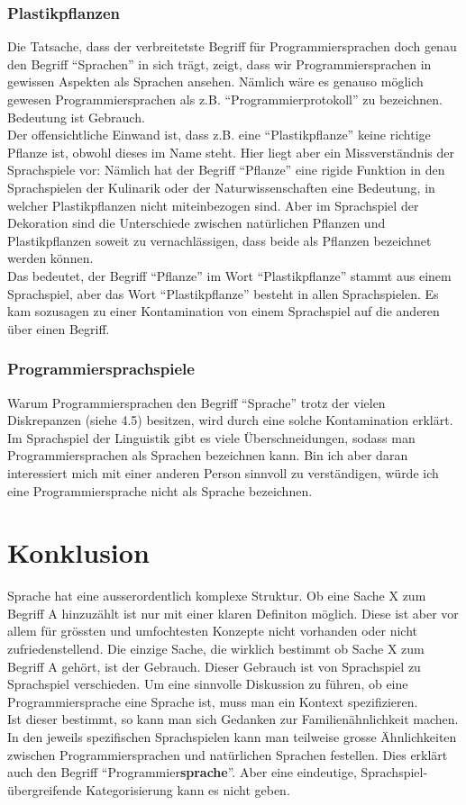 \documentclass[10pt,a4paper]{article}
\begin{document}
\subsubsection{Plastikpflanzen}
Die Tatsache, dass der verbreitetste Begriff für Programmiersprachen doch genau den Begriff \enquote{Sprachen} in sich trägt, zeigt, dass wir Programmiersprachen in gewissen Aspekten als Sprachen ansehen. Nämlich wäre es genauso möglich gewesen Programmiersprachen als z.B. \enquote{Programmierprotokoll} zu bezeichnen. Bedeutung ist Gebrauch. \\
Der offensichtliche Einwand ist, dass z.B. eine \enquote{Plastikpflanze} keine richtige Pflanze ist, obwohl dieses im Name steht. Hier liegt aber ein Missverständnis der Sprachspiele vor: Nämlich hat der Begriff \enquote{Pflanze} eine rigide Funktion in den Sprachspielen der Kulinarik oder der Naturwissenschaften eine Bedeutung, in welcher Plastikpflanzen nicht miteinbezogen sind. Aber im Sprachspiel der Dekoration sind die Unterschiede zwischen natürlichen Pflanzen und Plastikpflanzen soweit zu vernachlässigen, dass beide als Pflanzen bezeichnet werden können. \\
Das bedeutet, der Begriff \enquote{Pflanze} im Wort \enquote{Plastikpflanze} stammt aus einem Sprachspiel, aber das Wort \enquote{Plastikpflanze} besteht in allen Sprachspielen. Es kam sozusagen zu einer Kontamination von einem Sprachspiel auf die anderen über einen Begriff.

\subsubsection{Programmiersprachspiele}
Warum Programmiersprachen den Begriff \enquote{Sprache} trotz der vielen Diskrepanzen (siehe 4.5) besitzen, wird durch eine solche Kontamination erklärt. Im Sprachspiel der Linguistik gibt es viele Überschneidungen, sodass man Programmiersprachen als Sprachen bezeichnen kann. Bin ich aber daran interessiert mich mit einer anderen Person sinnvoll zu verständigen, würde ich eine Programmiersprache nicht als Sprache bezeichnen.


\section{Konklusion}
Sprache hat eine ausserordentlich komplexe Struktur. Ob eine Sache X zum Begriff A hinzuzählt ist nur mit einer klaren Definiton möglich. Diese ist aber vor allem für grössten und umfochtesten Konzepte nicht vorhanden oder nicht zufriedenstellend.
Die einzige Sache, die wirklich bestimmt ob Sache X zum Begriff A gehört, ist der Gebrauch.
Dieser Gebrauch ist von Sprachspiel zu Sprachspiel verschieden.
Um eine sinnvolle Diskussion zu führen, ob eine Programmiersprache eine Sprache ist, muss man ein Kontext spezifizieren. \\
Ist dieser bestimmt, so kann man sich Gedanken zur Familienähnlichkeit machen.
In den jeweils spezifischen Sprachspielen kann man teilweise grosse Ähnlichkeiten zwischen Programmiersprachen und natürlichen Sprachen festellen. Dies erklärt auch den Begriff \enquote{Programmier\textbf{sprache}}. Aber eine eindeutige, Sprachspiel-übergreifende Kategorisierung kann es nicht geben.
\end{document}

